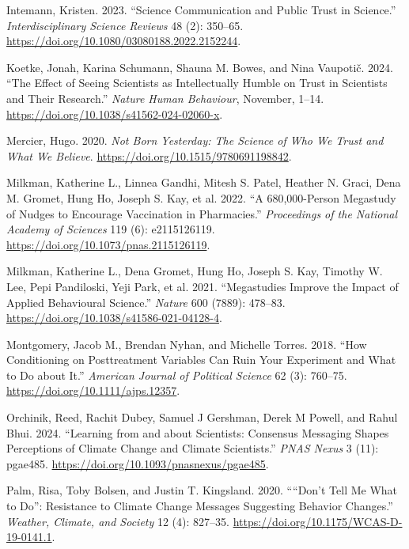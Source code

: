 \documentclass[
  letterpaper,
  DIV=11,
  numbers=noendperiod]{scrartcl}
\newlength{\cslhangindent}
\newenvironment{CSLReferences}[2] %
 {\begin{list}{}{%
  \setlength{\itemindent}{0pt}
  \setlength{\leftmargin}{0pt}
  \setlength{\parsep}{0pt}
  \ifodd #1
   \setlength{\leftmargin}{\cslhangindent}
   \setlength{\itemindent}{-1\cslhangindent}
  \fi
  \setlength{\itemsep}{#2\baselineskip}}}
 {\end{list}}
\begin{document}
\begin{CSLReferences}{1}{0}
Intemann, Kristen. 2023. {``Science Communication and Public Trust in
Science.''} \emph{Interdisciplinary Science Reviews} 48 (2): 350--65.
\url{https://doi.org/10.1080/03080188.2022.2152244}.

Koetke, Jonah, Karina Schumann, Shauna M. Bowes, and Nina Vaupotič.
2024. {``The Effect of Seeing Scientists as Intellectually Humble on
Trust in Scientists and Their Research.''} \emph{Nature Human
Behaviour}, November, 1--14.
\url{https://doi.org/10.1038/s41562-024-02060-x}.

Mercier, Hugo. 2020. \emph{Not Born Yesterday: The Science of Who We
Trust and What We Believe}. \url{https://doi.org/10.1515/9780691198842}.

Milkman, Katherine L., Linnea Gandhi, Mitesh S. Patel, Heather N. Graci,
Dena M. Gromet, Hung Ho, Joseph S. Kay, et al. 2022. {``A 680,000-Person
Megastudy of Nudges to Encourage Vaccination in Pharmacies.''}
\emph{Proceedings of the National Academy of Sciences} 119 (6):
e2115126119. \url{https://doi.org/10.1073/pnas.2115126119}.

Milkman, Katherine L., Dena Gromet, Hung Ho, Joseph S. Kay, Timothy W.
Lee, Pepi Pandiloski, Yeji Park, et al. 2021. {``Megastudies Improve the
Impact of Applied Behavioural Science.''} \emph{Nature} 600 (7889):
478--83. \url{https://doi.org/10.1038/s41586-021-04128-4}.

Montgomery, Jacob M., Brendan Nyhan, and Michelle Torres. 2018. {``How
Conditioning on Posttreatment Variables Can Ruin Your Experiment and
What to Do about It.''} \emph{American Journal of Political Science} 62
(3): 760--75. \url{https://doi.org/10.1111/ajps.12357}.

Orchinik, Reed, Rachit Dubey, Samuel J Gershman, Derek M Powell, and
Rahul Bhui. 2024. {``Learning from and about Scientists: Consensus
Messaging Shapes Perceptions of Climate Change and Climate
Scientists.''} \emph{PNAS Nexus} 3 (11): pgae485.
\url{https://doi.org/10.1093/pnasnexus/pgae485}.

Palm, Risa, Toby Bolsen, and Justin T. Kingsland. 2020. {``{``}Don{'}t
Tell Me What to Do{''}: Resistance to Climate Change Messages Suggesting
Behavior Changes.''} \emph{Weather, Climate, and Society} 12 (4):
827--35. \url{https://doi.org/10.1175/WCAS-D-19-0141.1}.


\end{CSLReferences}
\end{document}
